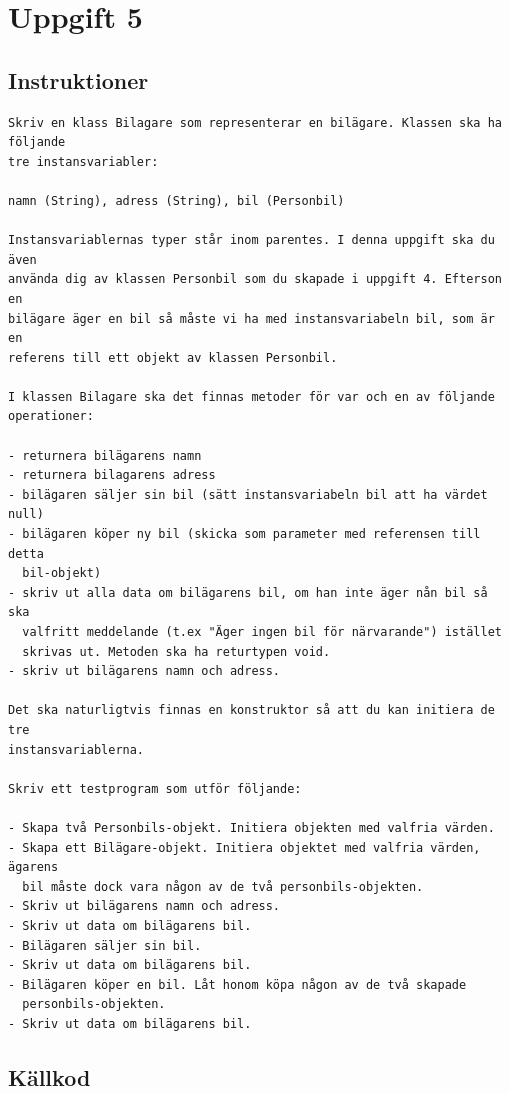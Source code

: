 \section{Uppgift 5}\label{sec:uppg05}

\subsection{Instruktioner}
\begin{Verbatim}[fontsize=small]
Skriv en klass Bilagare som representerar en bilägare. Klassen ska ha följande
tre instansvariabler:

namn (String), adress (String), bil (Personbil)

Instansvariablernas typer står inom parentes. I denna uppgift ska du även
använda dig av klassen Personbil som du skapade i uppgift 4. Efterson en
bilägare äger en bil så måste vi ha med instansvariabeln bil, som är en
referens till ett objekt av klassen Personbil.

I klassen Bilagare ska det finnas metoder för var och en av följande
operationer:

- returnera bilägarens namn
- returnera bilagarens adress
- bilägaren säljer sin bil (sätt instansvariabeln bil att ha värdet null)
- bilägaren köper ny bil (skicka som parameter med referensen till detta
  bil-objekt)
- skriv ut alla data om bilägarens bil, om han inte äger nån bil så ska
  valfritt meddelande (t.ex "Äger ingen bil för närvarande") istället
  skrivas ut. Metoden ska ha returtypen void.
- skriv ut bilägarens namn och adress.

Det ska naturligtvis finnas en konstruktor så att du kan initiera de tre
instansvariablerna.

Skriv ett testprogram som utför följande:

- Skapa två Personbils-objekt. Initiera objekten med valfria värden.
- Skapa ett Bilägare-objekt. Initiera objektet med valfria värden, ägarens
  bil måste dock vara någon av de två personbils-objekten.
- Skriv ut bilägarens namn och adress.
- Skriv ut data om bilägarens bil.
- Bilägaren säljer sin bil.
- Skriv ut data om bilägarens bil.
- Bilägaren köper en bil. Låt honom köpa någon av de två skapade
  personbils-objekten.
- Skriv ut data om bilägarens bil.
\end{Verbatim}


\subsection{Källkod}
